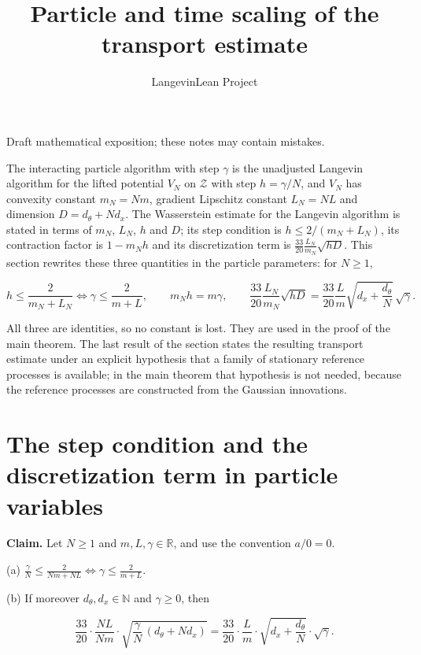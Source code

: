 \documentclass[11pt,a4paper]{article}
\title{\texorpdfstring{Particle and time scaling of the transport estimate}{Particle and time scaling of the transport estimate}}
\author{LangevinLean Project}
\date{}
\begin{document}
\maketitle
Draft mathematical exposition; these notes may contain mistakes.


The interacting particle algorithm with step \(\gamma\) is the unadjusted Langevin algorithm for the lifted potential \(V_N\) on \(\mathcal Z\) with step \(h=\gamma/N\), and \(V_N\) has convexity constant \(m_N=Nm\), gradient Lipschitz constant \(L_N=NL\) and dimension \(D=d_\theta+Nd_x\). The Wasserstein estimate for the Langevin algorithm is stated in terms of \(m_N\), \(L_N\), \(h\) and \(D\); its step condition is \(h\le2/(m_N+L_N)\), its contraction factor is \(1-m_Nh\) and its discretization term is \(\frac{33}{20}\frac{L_N}{m_N}\sqrt{hD}\). This section rewrites these three quantities in the particle parameters: for \(N\ge1\),


\[h\le\frac2{m_N+L_N}\iff\gamma\le\frac2{m+L},\qquad m_Nh=m\gamma,\qquad\frac{33}{20}\frac{L_N}{m_N}\sqrt{hD}=\frac{33}{20}\frac Lm\sqrt{d_x+\frac{d_\theta}N}\,\sqrt\gamma .\]


All three are identities, so no constant is lost. They are used in the proof of the main theorem. The last result of the section states the resulting transport estimate under an explicit hypothesis that a family of stationary reference processes is available; in the main theorem that hypothesis is not needed, because the reference processes are constructed from the Gaussian innovations.


\section{\texorpdfstring{The step condition and the discretization term in particle variables}{The step condition and the discretization term in particle variables}}


\textbf{Claim.} Let \(N\ge1\) and \(m,L,\gamma\in\mathbb R\), and use the convention \(a/0=0\).




(a) \(\displaystyle\frac\gamma N\le\frac2{Nm+NL}\iff\gamma\le\frac2{m+L}\).




(b) If moreover \(d_\theta,d_x\in\mathbb N\) and \(\gamma\ge0\), then


\[\frac{33}{20}\cdot\frac{NL}{Nm}\cdot\sqrt{\frac\gamma N\,(d_\theta+Nd_x)}=\frac{33}{20}\cdot\frac Lm\cdot\sqrt{d_x+\frac{d_\theta}N}\cdot\sqrt\gamma .\]
\end{document}
